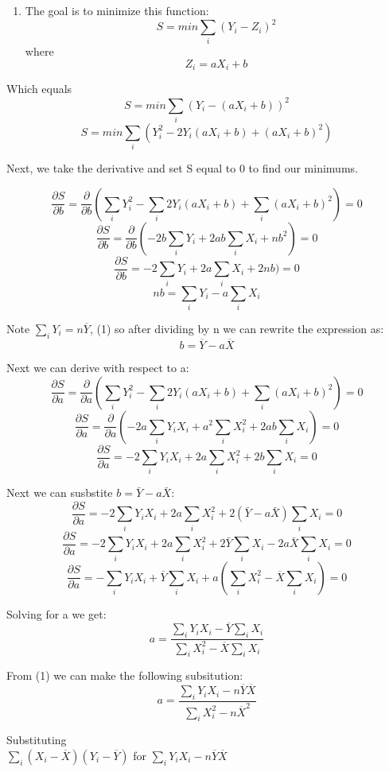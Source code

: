 \documentclass[11pt]{article}
\providecommand{\tightlist}{%
      \setlength{\itemsep}{0pt}\setlength{\parskip}{0pt}}
\begin{document}
    \begin{enumerate}
\def\labelenumi{\roman{enumi})}
\tightlist
\item
  The goal is to minimize this function:
  \[S = min \sum_{i}{(Y_i- Z_i)^2}\]where \[Z_i = {aX_i + b}\]
\end{enumerate}

Which equals \[S = min \sum_{i}{(Y_i- (aX_i + b))^2}\]
\[S = min \sum_{i}{(Y_i^2- 2Y_i(aX_i + b) + (aX_i + b)^2)}\]

Next, we take the derivative and set S equal to 0 to find our minimums.

\[\frac{\partial S}{\partial b} = \frac{\partial}{\partial b}(\sum_{i}{Y_i^2} -\sum_{i}{2Y_i(aX_i + b)} + \sum_{i}{(aX_i + b)^2}) = 0 \]
\[\frac{\partial S}{\partial b} = \frac{\partial}{\partial b}(-2b\sum_{i}{Y_i} + 2ab\sum_{i}{X_i} + nb^2) = 0 \]
\[\frac{\partial S}{\partial b} = -2\sum_{i}{Y_i} + 2a\sum_{i}{X_i} + 2nb) = 0 \]
\[nb = \sum_{i}{Y_i} - a\sum_{i}{X_i} \]

Note \(\sum_{i}{Y_i} = n\overline{Y}\), (1) so after dividing by n we
can rewrite the expression as: \[ b = \overline{Y} - a\overline{X} \]

Next we can derive with respect to a:
\[\frac{\partial S}{\partial a} = \frac{\partial}{\partial a}(\sum_{i}{Y_i^2} -\sum_{i}{2Y_i(aX_i + b)} + \sum_{i}{(aX_i + b)^2}) = 0 \]
\[\frac{\partial S}{\partial a} = \frac{\partial}{\partial a}(-2a\sum_{i}{Y_i X_i} + a^2\sum_{i}{X_i^2} + 2ab\sum_{i}{X_i}) = 0 \]
\[\frac{\partial S}{\partial a} = -2\sum_{i}{Y_i X_i} + 2a\sum_{i}{X_i^2} + 2b\sum_{i}{X_i} = 0 \]

Next we can susbstite \(b = \bar{Y} - a\bar{X}\):
\[\frac{\partial S}{\partial a} = -2\sum_{i}{Y_i X_i} + 2a\sum_{i}{X_i^2} + 2(\bar{Y} - a\bar{X})\sum_{i}{X_i} = 0 \]
\[\frac{\partial S}{\partial a} = -2\sum_{i}{Y_i X_i} + 2a\sum_{i}{X_i^2} + 2\bar{Y}\sum_{i}{X_i} - 2a\bar{X}\sum_{i}{X_i} = 0 \]
\[\frac{\partial S}{\partial a} = -\sum_{i}{Y_i X_i} + \overline{Y}\sum_{i}{X_i} + a(\sum_{i}{X_i^2} - \overline{X}\sum_{i}{X_i}) = 0 \]

Solving for a we get:
\[a = \frac{\sum_{i}{Y_i X_i} - \overline{Y}\sum_{i}{X_i}}{\sum_{i}{X_i^2} - \overline{X}\sum_{i}{X_i}} \]

From (1) we can make the following subsitution:
\[a = \frac{\sum_{i}{Y_i X_i} - n\overline{Y}\overline{X}}{\sum_{i}{X_i^2} - n\overline{X}^2} \]

Substituting\\
\(\sum_{i}{(X_i - \overline{X})(Y_i - \overline{Y})}\) for
\(\sum_{i}{Y_i X_i} - n\overline{Y}\overline{X}\)
\end{document}
